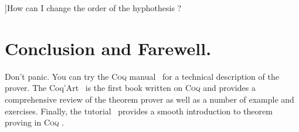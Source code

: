 \documentclass[a4paper]{faq}
\def\Coq{\textsc{Coq }}
\begin{document}

\Question[hyphotesisorder]]{How can I change the order of the hyphothesis ?}









\section{Conclusion and Farewell.}
\label{ccl}

\label{lastquestion}

Don't panic. You can try the \Coq manual~\cite{Coq:e} for a technical
description of the prover. The Coq'Art~\cite{Coq:coqart} is the first
book written on \Coq and provides a comprehensive review of the
theorem prover as well as a number of example and exercises. Finally,
the tutorial~\cite{Coq:Tutorial} provides a smooth introduction to
theorem proving in \Coq.

\newpage
\nocite{LaTeX:intro}
\nocite{LaTeX:symb}



\end{document}
